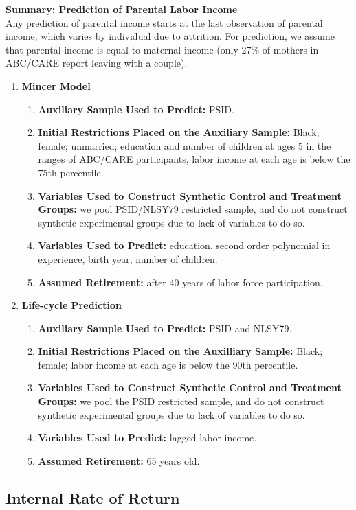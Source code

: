 \noindent \textbf{Summary: Prediction of Parental Labor Income}\\
\noindent Any prediction of parental income starts at the last observation of parental income, which varies by individual due to attrition. For prediction, we assume that parental income is equal to maternal income (only 27\% of mothers in ABC/CARE report leaving with a couple).
\begin{enumerate}
\item \textbf{Mincer Model}
\begin{enumerate}
\item \textbf{Auxiliary Sample Used to Predict:} PSID.
\item \textbf{Initial Restrictions Placed on the Auxiliary Sample:} Black; female; unmarried; education and number of children at ages 5 in the ranges of ABC/CARE participants, labor income at each age is below the 75th percentile.
\item \textbf{Variables Used to Construct Synthetic Control and Treatment Groups:} we pool PSID/NLSY79 restricted sample, and do not construct synthetic experimental groups due to lack of variables to do so.
\item \textbf{Variables Used to Predict:} education, second order polynomial in experience, birth year, number of children.
\item \textbf{Assumed Retirement:} after 40 years of labor force participation.
\end{enumerate}
\item \textbf{Life-cycle Prediction}
\begin{enumerate}
\item \textbf{Auxiliary Sample Used to Predict:} PSID and NLSY79.
\item \textbf{Initial Restrictions Placed on the Auxilliary Sample:} Black; female; labor income at each age is below the 90th percentile.
\item \textbf{Variables Used to Construct Synthetic Control and Treatment Groups:} we pool the PSID restricted sample, and do not construct synthetic experimental groups due to lack of variables to do so.
\item \textbf{Variables Used to Predict:} lagged labor income.
\item \textbf{Assumed Retirement:} 65 years old.
\end{enumerate}
\end{enumerate}

\subsection{Internal Rate of Return}
\label{app:method_irr}

